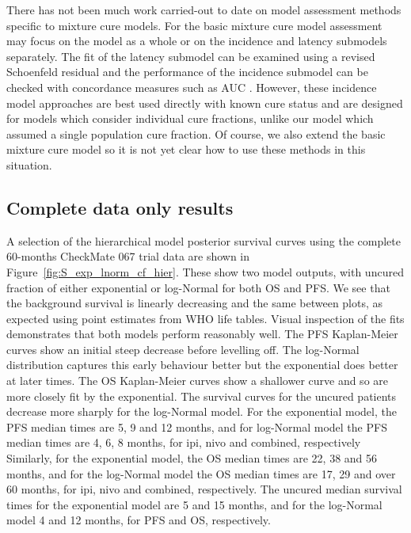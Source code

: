 \documentclass[AMA,STIX1COL]{WileyNJD-v2}
\begin{document}
There has not been much work carried-out to date on model assessment methods specific to mixture cure models.
For the basic mixture cure model assessment may focus on the model as a whole or on the incidence and latency submodels separately.
The fit of the latency submodel can be examined using a revised Schoenfeld residual \cite{Wileyto2013} and the performance of the incidence submodel can be checked with concordance measures such as AUC \cite{Peng2021}.
However, these incidence model approaches are best used directly with known cure status and are designed for models which consider individual cure fractions, unlike our model which assumed a single population cure fraction.
Of course, we also extend the basic mixture cure model so it is not yet clear how to use these methods in this situation. 
%
\subsection{Complete data only results} \label{sec:results}
A selection of the hierarchical model posterior survival curves using the complete 60-months CheckMate 067 trial data are shown in Figure~\ref{fig:S_exp_lnorm_cf_hier}.
These show two model outputs, with uncured fraction of either exponential or log-Normal for both OS and PFS.
We see that the background survival is linearly decreasing and the same between plots, as expected using point estimates from WHO life tables.
Visual inspection of the fits demonstrates that both models perform reasonably well.
The PFS Kaplan-Meier curves show an initial steep decrease before levelling off.
The log-Normal distribution captures this early behaviour better but the exponential does better at later times.
The OS Kaplan-Meier curves show a shallower curve and so are more closely fit by the exponential.
The survival curves for the uncured patients decrease more sharply for the log-Normal model.
For the exponential model, the PFS median times are 5, 9 and 12 months,
and for log-Normal model the PFS median times are 4, 6, 8 months, for ipi, nivo and combined, respectively
Similarly, for the exponential model, the OS median times are 22, 38 and 56 months,
and for the log-Normal model the OS median times are 17, 29 and over 60 months, for ipi, nivo and combined, respectively.
The uncured median survival times for the exponential model are 5 and 15 months, and for the log-Normal model 4 and 12 months, for PFS and OS, respectively.
\end{document}
